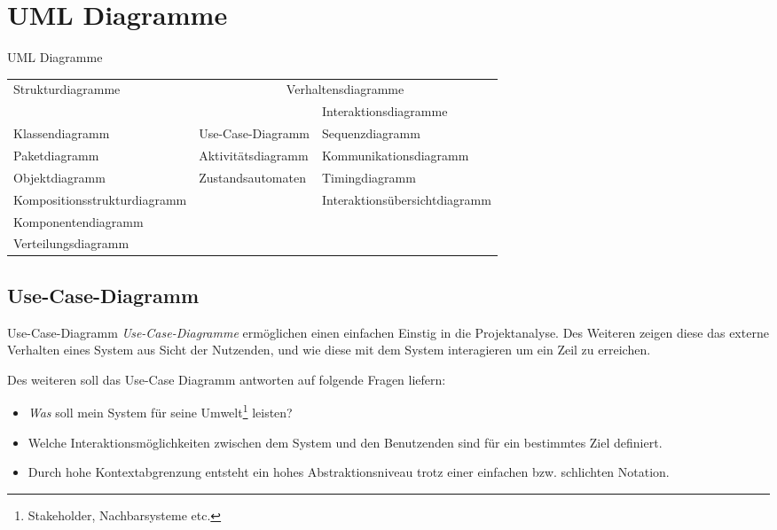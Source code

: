 \section{UML Diagramme}

\begin{bonus}{UML Diagramme}
    \begin{tabular}{|l|l|l|}
        \hline
        \multirow{2}{*}{Strukturdiagramme} & \multicolumn{2}{c|}{Verhaltensdiagramme}                                 \\\cline{2-3}
                                           &                                          & Interaktionsdiagramme         \\\hline
        Klassendiagramm                    & Use-Case-Diagramm                        & Sequenzdiagramm               \\
        Paketdiagramm                      & Aktivitätsdiagramm                       & Kommunikationsdiagramm        \\
        Objektdiagramm                     & Zustandsautomaten                        & Timingdiagramm                \\
        Kompositionsstrukturdiagramm       &                                          & Interaktionsübersichtdiagramm \\
        Komponentendiagramm                &                                          &                               \\
        Verteilungsdiagramm                &                                          &                               \\\hline
    \end{tabular}
\end{bonus}

\subsection{Use-Case-Diagramm}

\begin{defi}{Use-Case-Diagramm}
    \emph{Use-Case-Diagramme} ermöglichen einen einfachen Einstig in die Projektanalyse.
    Des Weiteren zeigen diese das externe Verhalten eines System aus Sicht der Nutzenden, und wie diese mit dem System interagieren um ein Zeil zu erreichen.

    Des weiteren soll das Use-Case Diagramm antworten auf folgende Fragen liefern:
    \begin{itemize}
        \item \emph{Was} soll mein System für seine Umwelt\footnote{Stakeholder, Nachbarsysteme etc.} leisten?
        \item Welche Interaktionsmöglichkeiten zwischen dem System und den Benutzenden sind für ein bestimmtes Ziel definiert.
        \item Durch hohe Kontextabgrenzung entsteht ein hohes Abstraktionsniveau trotz einer einfachen bzw. schlichten Notation.
    \end{itemize}
\end{defi}

